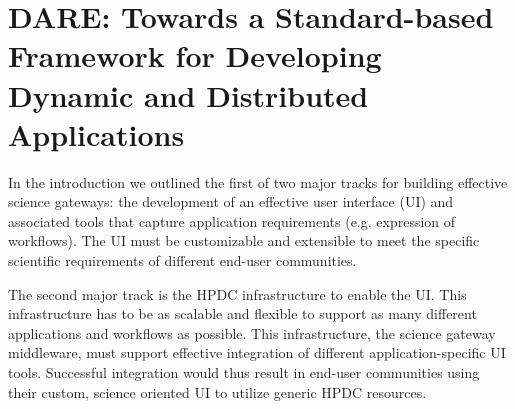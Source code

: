 \documentclass[]{svjour3}
\begin{document}







\section{DARE: Towards a Standard-based Framework for Developing
  Dynamic and Distributed Applications}

In the introduction we outlined the first of two major tracks for building
effective science gateways: the development of an effective user interface (UI)
and associated tools that capture application requirements (e.g. expression of workflows).
The UI must be customizable and extensible to meet the specific scientific requirements
of different end-user communities.

The second major track is the HPDC infrastructure to enable the UI. This
infrastructure has to be as scalable and flexible
to support as many different applications and workflows as possible. This infrastructure,
the science gateway middleware, must support effective integration of different
application-specific UI tools. Successful integration would thus result in
end-user communities using their custom, science oriented UI to utilize generic
HPDC resources.
\end{document}
